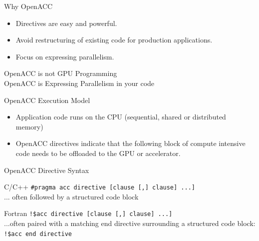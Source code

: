 \documentclass[10pt,t]{beamer}
\begin{document}
\begin{frame}{ Why OpenACC}
  \begin{exampleblock}{}
    \begin{itemize}
      \item Directives are easy and powerful.
      \item Avoid restructuring of existing code for production applications.
      \item Focus on expressing parallelism.
    \end{itemize}
  \end{exampleblock}
  \vspace{1cm}
  \begin{alertblock}{}
    \begin{center}
      \vspace{0.1cm}
      \Large{\color{red!80!black}OpenACC is not GPU Programming}\\
      \vspace{1cm}
      \Large{\color{red!80!black}OpenACC is Expressing Parallelism in your code}
    \end{center}
  \end{alertblock}
\end{frame}

\begin{frame}{ OpenACC Execution Model}
  \begin{exampleblock}{}
    \begin{itemize}
      \item Application code runs on the CPU (sequential, shared or distributed memory)
      \item OpenACC directives indicate that the following block of compute intensive code needs to be offloaded to the GPU or accelerator.
    \end{itemize}
    \vspace{-0.5cm}
    
  \end{exampleblock}
\end{frame}

\begin{frame}[fragile]{OpenACC Directive Syntax}
  \begin{exampleblock}{C/C++}
    \lstinline[basicstyle=\fontsize{12}{14}\selectfont,language=OmpC]|#pragma acc directive [clause [,] clause] ...]|
\\
     ... often followed by a structured code block
  \end{exampleblock}

  \begin{exampleblock}{Fortran}
    \lstinline[basicstyle=\fontsize{12}{14}\selectfont,language=OmpFortran]|!$acc directive [clause [,] clause] ...]|
      \\
      ...often paired with a matching end directive surrounding a structured  code block:
      \\
      \lstinline[basicstyle=\fontsize{12}{14}\selectfont,language=OmpFortran]|!$acc end directive|
  \end{exampleblock}
\end{frame}
\end{document}
